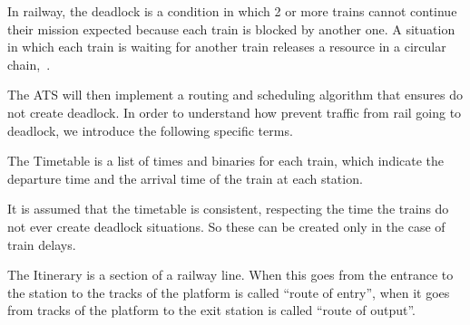 \documentclass{ewic}
\begin{document}
In railway, the deadlock is a condition in which 2 or more trains cannot  continue their mission expected because each train is blocked by another one.
A situation in which each train is waiting for another train releases a resource in a circular chain,~\cite{Pachl2012}.



The ATS will then implement a routing and scheduling algorithm that ensures do not create deadlock. In order to understand how prevent traffic from rail going to deadlock, we introduce the following specific terms.


The Timetable is a list of times and binaries for each train, which indicate the departure time and the arrival time of the train at each station.

It is assumed that the timetable is consistent, respecting the time the trains do not ever create deadlock situations. So these can be created only in the case of train delays.


The Itinerary is a section of a railway line. When this goes from the entrance to the station to the tracks of the platform is called ``route of entry'', when it goes from tracks of the platform to the exit station is called ``route of output''.

\end{document}
